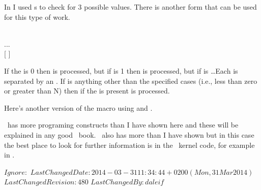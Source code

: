     In \cmd{\@fibseries} I used s to check for 3 possible values.
There is another  form that can be used for this type of work.
\begin{syntax}
     
    \\
... \\
  [   ]  \\
\end{syntax}
If the  is 0 then  is processed, but if
 is 1 then  is processed, but if 
is \ldots Each  is separated by an . If 
is anything other than the specified cases (i.e., less than zero or greater
than N) then if the  is present  is
processed. 

Here's another version of the \cmd{\@fibseries} macro using 
and \cmd{\@whilenum}.
\begin{lcode}
\renewcommand*{\@fibseries}[1]{%
  \fibtogo=#1\relax
  \ifcase \fibtogo %
  \or  %
    \the\fibprevprev
  \or  %
    \the\fibprevprev{} and \the\fibprev
  \else %
    \advance\fibtogo by -\tw@
    \the\fibprevprev, \the\fibprev
    \@whilenum \fibtogo > \z@ \do {%
      \@fibnext}%
  \fi}
\end{lcode}

    \tx\ has more programing constructs than I have shown here and these
will be explained in any good \tx\ book. \ltx\ also has more than I have shown
but in this case the best place to look for further information is in the
\ltx\ kernel code, for example in .




\svnidlong
{$Ignore: $}
{$LastChangedDate: 2014-03-31 11:34:44 +0200 (Mon, 31 Mar 2014) $}
{$LastChangedRevision: 480 $}
{$LastChangedBy: daleif $}






